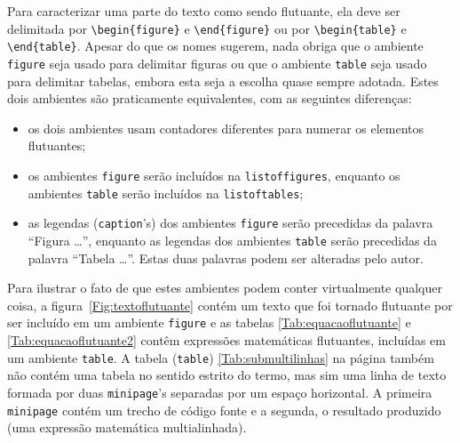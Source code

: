 Para caracterizar uma parte do texto como sendo flutuante, ela deve ser
delimitada por \verb|\begin{figure}| e \verb|\end{figure}| ou por
\verb|\begin{table}| e \verb|\end{table}|. Apesar do que os nomes
sugerem, nada obriga que o ambiente \texttt{figure} seja usado para
delimitar figuras ou que o ambiente \texttt{table} seja usado para
delimitar tabelas, embora esta seja a escolha quase sempre
adotada. Estes dois ambientes são praticamente equivalentes, com as
seguintes diferenças:
\begin{itemize}
\item os dois ambientes usam contadores diferentes para numerar os
elementos flutuantes;
\item os ambientes \texttt{figure} serão incluídos na
\texttt{listoffigures}, enquanto os ambientes \texttt{table} serão
incluídos na \texttt{listoftables};
\item as legendas (\texttt{caption}'s) dos ambientes \texttt{figure}
serão precedidas da palavra ``Figura \dots'', enquanto as legendas dos
ambientes \texttt{table} serão precedidas da palavra ``Tabela \dots''.
Estas duas palavras podem ser alteradas pelo autor.
\end{itemize}
Para ilustrar o fato de que estes ambientes podem conter virtualmente
qualquer coisa, a figura~\ref{Fig:textoflutuante} contém um texto que
foi tornado flutuante por ser incluído em um ambiente \texttt{figure}
e as tabelas \ref{Tab:equacaoflutuante} e \ref{Tab:equacaoflutuante2}
contêm expressões matemáticas flutuantes, incluídas em um ambiente
\texttt{table}. A tabela (\texttt{table}) \ref{Tab:submultilinhas} na
página \pageref{Tab:submultilinhas} também não contém uma tabela no
sentido estrito do termo, mas sim uma linha de texto formada por duas
\texttt{minipage}'s separadas por um espaço horizontal. A primeira
\texttt{minipage} contém um trecho de código fonte e a segunda, o
resultado produzido (uma expressão matemática multialinhada).


